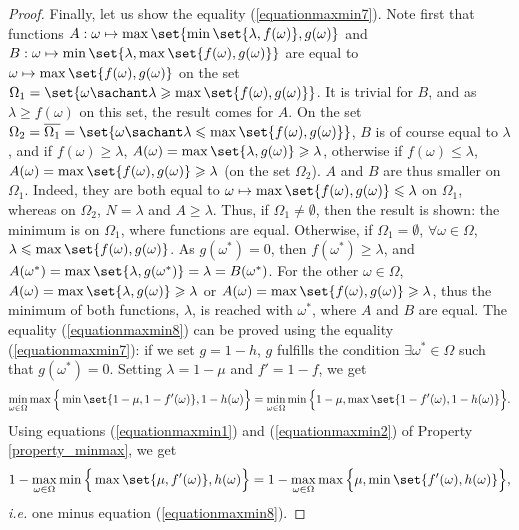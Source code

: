 \begin{proof}
Finally, let us show the equality (\ref{equationmaxmin7}).
Note first that functions $A: \omega \mapsto \max \set{ \min \set{ \lambda, f(\omega) }, g(\omega) }$ 
and $B: \omega \mapsto \min \set{ \lambda, \max \set{ f(\omega), g(\omega) } }$ are equal to
$\omega \mapsto \max \set{ f(\omega), g(\omega) }$ on the set $\Omega_1 = \set{ \omega \sachant \lambda \geqslant \max \set{ f(\omega), g(\omega) }}$.
It is trivial for $B$, and as $\lambda \geqslant f(\omega)$ on this set, the result comes for $A$.
On the set $\Omega_2 = \overline{\Omega_1} = \set{ \omega \sachant \lambda \leqslant \max \set{ f(\omega), g(\omega) } }$,
$B$ is of course equal to $\lambda$, and if $f(\omega) \geqslant \lambda$, $A(\omega) = \max \set{ \lambda, g(\omega) } \geqslant \lambda$,
otherwise if $f(\omega) \leqslant \lambda$, $A(\omega) = \max \set{ f(\omega), g(\omega) } \geqslant \lambda$ (on the set $\Omega_2$).
$A$ and $B$ are thus smaller on $\Omega_1$.
Indeed, they are both equal to $\omega \mapsto \max \set{ f(\omega), g(\omega) } \leqslant \lambda$ on $\Omega_1$,
whereas on $\Omega_2$, $N=\lambda$ and $A \geqslant \lambda$.
Thus, if $\Omega_1 \neq \emptyset$, then the result is shown: the minimum is on $\Omega_1$, where functions are equal.
Otherwise, if $\Omega_1 = \emptyset$, $\forall \omega \in \Omega$, $\lambda \leqslant \max \set{ f(\omega), g(\omega) }$.
As $g(\omega^*)=0$, then $f(\omega^*) \geqslant \lambda$, and $A(\omega^*) = \max \set{ \lambda, g(\omega^*) } = \lambda = B(\omega^*)$.
For the other $\omega \in \Omega$, $A(\omega) = \max \set{ \lambda, g(\omega) } \geqslant \lambda$
or $A(\omega) =\max \set{ f(\omega), g(\omega) } \geqslant \lambda$, thus the minimum of both functions, $\lambda$, is reached with $\omega^*$,
where $A$ and $B$ are equal.
The equality (\ref{equationmaxmin8}) can be proved using the equality (\ref{equationmaxmin7}):
if we set $g=1-h$, $g$ fulfills the condition $\exists \omega^* \in \Omega$ such that $g(\omega^*)=0$.
Setting $\lambda = 1 - \mu$ and $f' = 1 -f$, we get
\[ \min_{\omega \in \Omega} \max \Big\{ \min \set{ 1 -\mu, 1 - f'(\omega) }, 1 - h(\omega)  \Big\} = \min_{\omega \in \Omega} \min \Big\{ 1 -\mu, \max \set{ 1 - f'(\omega) , 1 - h(\omega) }  \Big\}.\]
Using equations (\ref{equationmaxmin1}) and (\ref{equationmaxmin2}) of Property \ref{property_minmax},
we get
\[ 1 - \max_{\omega \in \Omega} \min \Big\{ \max \set{ \mu, f'(\omega) }, h(\omega)  \Big\} = 1 - \max_{\omega \in \Omega} \max \Big\{ \mu, \min \set{ f'(\omega) , h(\omega) }  \Big\}, \]
\textit{i.e.} one minus equation (\ref{equationmaxmin8}).
\end{proof}









